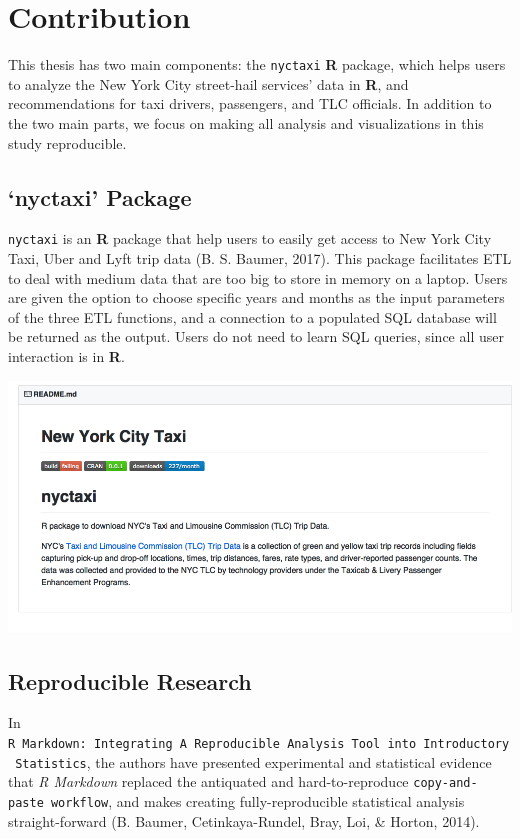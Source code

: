\documentclass[12pt,twoside]{reedthesis}
\theoremstyle{definition}
\theoremstyle{definition}
\theoremstyle{definition}
\theoremstyle{remark}
\begin{document}
\section{Contribution}\label{contribution}

This thesis has two main components: the \texttt{nyctaxi} \textbf{R}
package, which helps users to analyze the New York City street-hail
services' data in \textbf{R}, and recommendations for taxi drivers,
passengers, and TLC officials. In addition to the two main parts, we
focus on making all analysis and visualizations in this study
reproducible.

\subsection{\texorpdfstring{`nyctaxi'
Package}{nyctaxi Package}}\label{nyctaxi-package}

\texttt{nyctaxi} is an \textbf{R} package that help users to easily get
access to New York City Taxi, Uber and Lyft trip data (B. S. Baumer,
2017). This package facilitates ETL to deal with medium data that are
too big to store in memory on a laptop. Users are given the option to
choose specific years and months as the input parameters of the three
ETL functions, and a connection to a populated SQL database will be
returned as the output. Users do not need to learn SQL queries, since
all user interaction is in \textbf{R}.
\begin{center}\includegraphics[width=5.88in]{figure/nyctaxi-page} \end{center}

\subsection{Reproducible Research}\label{reproducible-research}

In
\texttt{R\ Markdown:\ Integrating\ A\ Reproducible\ Analysis\ Tool\ into\ Introductory\ Statistics},
the authors have presented experimental and statistical evidence that
\emph{R Markdown} replaced the antiquated and hard-to-reproduce
\texttt{copy-and-paste\ workflow}, and makes creating fully-reproducible
statistical analysis straight-forward (B. Baumer, Cetinkaya-Rundel,
Bray, Loi, \& Horton, 2014).
\end{document}
